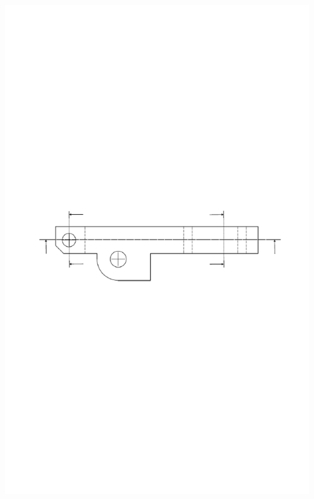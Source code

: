 \documentclass[11pt,oneside]{article}
\begin{document}
\begin{center}
\includegraphics[height=\textheight]{png/fig14}
\end{center}
\end{document}

